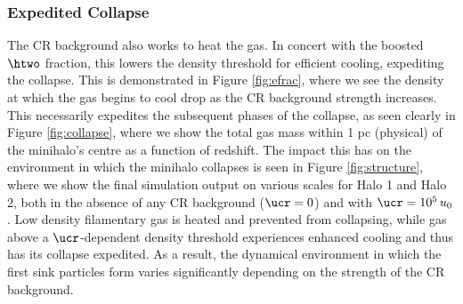 \subsubsection{Expedited Collapse}
\label{sec:expedited_collapse}
The CR background also works to heat the gas.  
In concert with the boosted $\htwo$ fraction, this lowers the density threshold for efficient cooling, expediting the collapse.  
This is demonstrated in Figure \ref{fig:efrac}, where we see the density at which the gas begins to cool drop as the CR background strength increases.  
This necessarily expedites the subsequent phases of the collapse, as seen clearly in Figure \ref{fig:collapse}, where we show the total gas mass within 1 pc (physical) of the minihalo's centre as a function of redshift.  
The impact this has on the environment in which the minihalo collapses is seen in Figure \ref{fig:structure}, where we show the final simulation output on various scales for Halo 1 and Halo 2, both in the absence of any CR background ($\ucr=0$) and with $\ucr=10^5\,u_0$. 
Low density filamentary gas is heated and prevented from collapsing, while gas above a $\ucr$-dependent density threshold experiences enhanced cooling and thus has its collapse expedited.
As a result, the dynamical environment in which the first sink particles form varies significantly depending on the strength of the CR background.